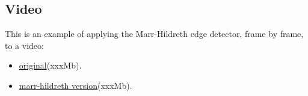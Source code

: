 \documentclass{ipol}
\begin{document}
\subsection{Video}

This is an example of applying the Marr-Hildreth edge detector, frame by frame, to a video:
\begin{itemize}
	\item \href{http://iie.fing.edu.uy/~haldos/ipol/video.mov}{original}(xxxMb).
	\item \href{http://iie.fing.edu.uy/~haldos/ipol/video.marr-hildreth.mp4}{marr-hildreth version}(xxxMb).
\end{itemize}

\begin{thebibliography}{9}

\end{thebibliography}
\end{document}
